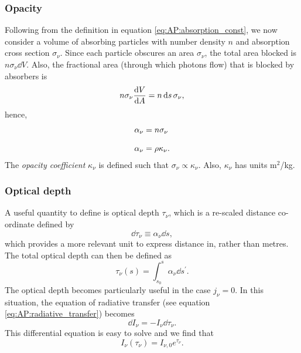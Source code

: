 \subsubsection{Opacity}
Following from the definition in equation \ref{eq:AP:absorption_const}, we now consider a volume of absorbing particles with number density \(n\) and absorption cross section \(\sigma_\nu\).
 Since each particle obscures an area \(\sigma_\nu\), the total area blocked is \(n\sigma_\nu\dd{V}\).
 Also, the fractional area (through which photons flow) that is blocked by absorbers is
%
\[n \sigma_\nu \dv{V}{A} = n \dd{s} \sigma_\nu,\]
%
hence,
% 
\begin{align*}
	\alpha_\nu &= n \sigma_\nu	
	\linedrop
	\alpha_\nu &= \rho \kappa_\nu.
\end{align*}
%
The \emph{opacity coefficient} \(\kappa_\nu\) is defined such that \(\sigma_\nu \propto \kappa_\nu\). Also, \(\kappa_\nu\) has units m\(^2\)/kg.
%
\subsubsection{Optical depth}
A useful quantity to define is optical depth \(\tau_\nu\), which is a re-scaled distance co-ordinate defined by
%
\[\dd{\tau_\nu} \equiv \alpha_\nu \dd{s},\]
%
which provides a more relevant unit to express distance in, rather than metres.
 The total optical depth can then be defined as
%
\[\tau_\nu (s) = \int_{s_0}^{s} \alpha_\nu \dd{s^\prime}.\]
%
The optical depth becomes particularly useful in the case \(j_\nu = 0\).
 In this situation, the equation of radiative transfer (see equation \ref{eq:AP:radiative_transfer}) becomes
%
\[\dd{I_\nu} = - I_\nu \dd{\tau_\nu}.\]
%
This differential equation is easy to solve and we find that
%
\begin{equation}
I_\nu (\tau_\nu) = I_{\nu,0} e^{\tau_\nu}.
\end{equation}
%
